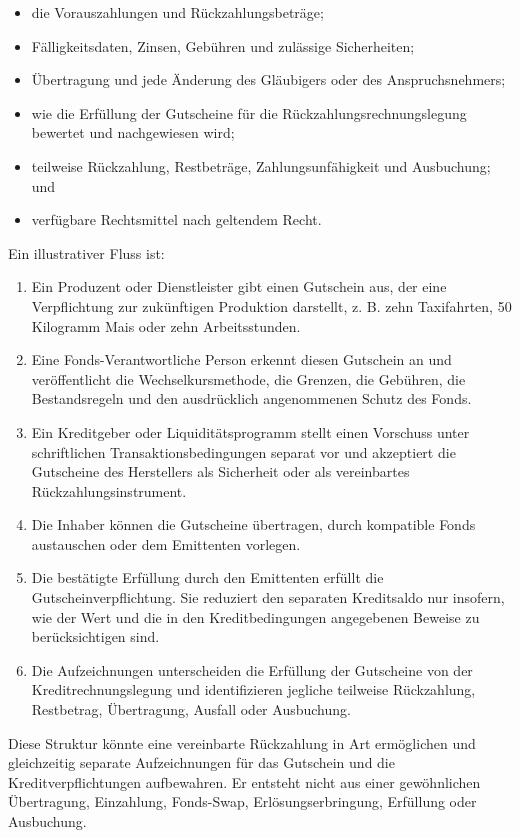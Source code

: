 \documentclass[11pt]{article}
\begin{document}
\begin{itemize}[leftmargin=*]
\item die Vorauszahlungen und Rückzahlungsbeträge;
\item Fälligkeitsdaten, Zinsen, Gebühren und zulässige Sicherheiten;
\item Übertragung und jede Änderung des Gläubigers oder des Anspruchsnehmers;
\item wie die Erfüllung der Gutscheine für die Rückzahlungsrechnungslegung bewertet und nachgewiesen wird;
\item teilweise Rückzahlung, Restbeträge, Zahlungsunfähigkeit und Ausbuchung; und
\item verfügbare Rechtsmittel nach geltendem Recht.
\end{itemize}
Ein illustrativer Fluss ist:

\begin{enumerate}[leftmargin=*]
\item Ein Produzent oder Dienstleister gibt einen Gutschein aus, der eine Verpflichtung zur zukünftigen Produktion darstellt, z. B. zehn Taxifahrten, 50 Kilogramm Mais oder zehn Arbeitsstunden.
\item Eine Fonds-Verantwortliche Person erkennt diesen Gutschein an und veröffentlicht die Wechselkursmethode, die Grenzen, die Gebühren, die Bestandsregeln und den ausdrücklich angenommenen Schutz des Fonds.
\item Ein Kreditgeber oder Liquiditätsprogramm stellt einen Vorschuss unter schriftlichen Transaktionsbedingungen separat vor und akzeptiert die Gutscheine des Herstellers als Sicherheit oder als vereinbartes Rückzahlungsinstrument.
\item Die Inhaber können die Gutscheine übertragen, durch kompatible Fonds austauschen oder dem Emittenten vorlegen.
\item Die bestätigte Erfüllung durch den Emittenten erfüllt die Gutscheinverpflichtung. Sie reduziert den separaten Kreditsaldo nur insofern, wie der Wert und die in den Kreditbedingungen angegebenen Beweise zu berücksichtigen sind.
\item Die Aufzeichnungen unterscheiden die Erfüllung der Gutscheine von der Kreditrechnungslegung und identifizieren jegliche teilweise Rückzahlung, Restbetrag, Übertragung, Ausfall oder Ausbuchung.
\end{enumerate}
Diese Struktur könnte eine vereinbarte Rückzahlung in Art ermöglichen und gleichzeitig separate Aufzeichnungen für das Gutschein und die Kreditverpflichtungen aufbewahren. Er entsteht nicht aus einer gewöhnlichen Übertragung, Einzahlung, Fonds-Swap, Erlösungserbringung, Erfüllung oder Ausbuchung.
\end{document}
